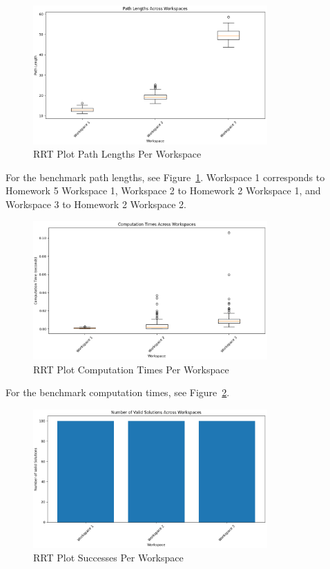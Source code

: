 \documentclass{article}
\begin{document}
\begin{figure}[h]
    \centering
    \includegraphics[width=0.8\textwidth]{e2bPathLengths.png}
    \caption{RRT Plot Path Lengths Per Workspace}
    \label{fig:e2bPathLengths}
\end{figure}

For the benchmark path lengths, see Figure~\ref{fig:e2bPathLengths}. Workspace 1 corresponds to Homework 5 Workspace 1, Workspace 2 to Homework 2 Workspace 1, and Workspace 3 to Homework 2 Workspace 2.

\begin{figure}[h]
    \centering
    \includegraphics[width=0.8\textwidth]{e2bTimes.png}
    \caption{RRT Plot Computation Times Per Workspace}
    \label{fig:e2bTimes}
\end{figure}

For the benchmark computation times, see Figure~\ref{fig:e2bTimes}.

\begin{figure}[h]
    \centering
    \includegraphics[width=0.8\textwidth]{e2bSuccesses.png}
    \caption{RRT Plot Successes Per Workspace}
    \label{fig:e2bSuccesses}
\end{figure}
\end{document}
